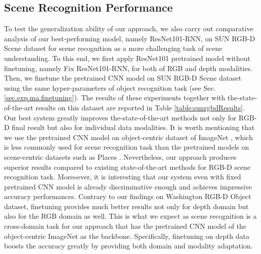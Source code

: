 \subsection{Scene Recognition Performance} \label{sec:exp.sceneRecognition}
To test the generalization ability of our approach, we also carry out comparative analysis of our best-performing model, namely ResNet101-RNN, on SUN RGB-D Scene \citep{Song_CVPR_2015} dataset for scene recognition as a more challenging task of scene understanding. To this end, we first apply ResNet101 pretrained model without finetuning, namely Fix ResNet101-RNN, for both of RGB and depth modalities. Then, we finetune the pretrained CNN model on SUN RGB-D Scene dataset using the same hyper-parameters of object recognition task (see Sec. \ref{sec.exp.ma.finetuning}). The results of these experiments together with the-state-of-the-art results on this dataset are reported in Table \ref{table:sunrgbdResults}. Our best system greatly improves the-state-of-the-art methods not only for RGB-D final result but also for individual data modalities. It is worth mentioning that we use the pretrained CNN model on object-centric dataset of ImageNet \citep{Deng_Imagenet_CVPR_2009}, which is less commonly used for scene recognition task than the pretrained models on scene-centric datasets such as Places \citep{Zhou_NIPS_2014}. Nevertheless, our approach produces superior results compared to existing state-of-the-art methods for RGB-D scene recognition task. Moreoever, it is interesting that our system even with fixed pretrained CNN model is already discriminative enough and achieves impressive accuracy performances. Contrary to our findings on Washington RGB-D Object dataset, finetuning provides much better results not only for depth domain but also for the RGB domain as well. This is what we expect as scene recognition is a cross-domain task for our approach that has the pretrained CNN model of the object-centric ImageNet as the backbone. Specifically, finetuning on depth data boosts the accuracy greatly by providing both domain and modality adaptation.
